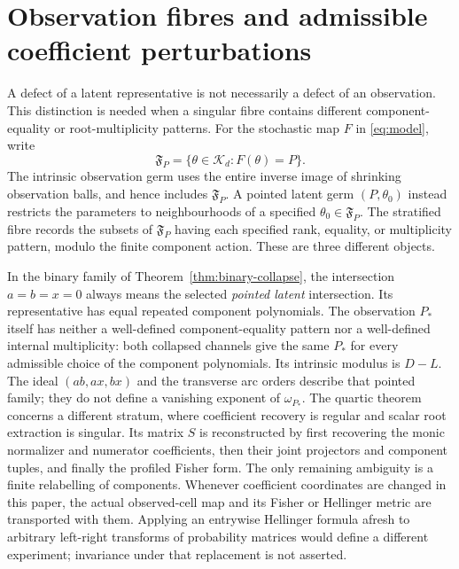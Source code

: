 \section{Observation fibres and admissible coefficient perturbations}
\label{sec:fibres-admissibility}
A defect of a latent representative is not necessarily a defect of
an observation. This distinction is needed when a singular fibre
contains different component-equality or root-multiplicity patterns.
For the stochastic map $F$ in \eqref{eq:model}, write
\[
 \mathfrak F_P=\{\theta\in\mathcal K_d:F(\theta)=P\}.
\]
The intrinsic observation germ uses the entire inverse image of
shrinking observation balls, and hence includes $\mathfrak F_P$.
A pointed latent germ $(P,\theta_0)$ instead restricts the parameters
to neighbourhoods of a specified $\theta_0\in\mathfrak F_P$.
The stratified fibre records the subsets of $\mathfrak F_P$ having
each specified rank, equality, or multiplicity pattern, modulo the
finite component action. These are three different objects.

In the binary family of Theorem~\ref{thm:binary-collapse}, the
intersection $a=b=x=0$ always means the selected \emph{pointed latent}
intersection. Its representative has equal repeated component
polynomials. The observation $P_*$ itself has neither a well-defined
component-equality pattern nor a well-defined internal multiplicity:
both collapsed channels give the same $P_*$ for every admissible choice
of the component polynomials. Its intrinsic modulus is $D-L$.
The ideal $(ab,ax,bx)$ and the transverse arc orders describe that
pointed family; they do not define a vanishing exponent of
$\omega_{P_*}$. The quartic theorem concerns a different stratum,
where coefficient recovery is regular and scalar root extraction is
singular. Its matrix $S$ is reconstructed by first recovering the
monic normalizer and numerator coefficients, then their joint
projectors and component tuples, and finally the profiled Fisher form.
The only remaining ambiguity is a finite relabelling of components.
Whenever coefficient coordinates are changed in this paper, the actual
observed-cell map and its Fisher or Hellinger metric are transported
with them. Applying an entrywise Hellinger formula afresh to arbitrary
left-right transforms of probability matrices would define a different
experiment; invariance under that replacement is not asserted.

